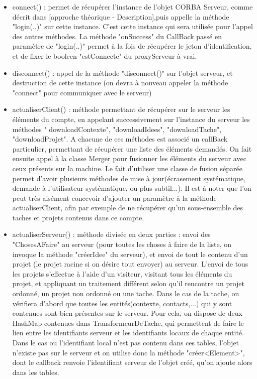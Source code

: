 \documentclass[a4paper, french, 11pt]{report}
\begin{document}
\begin{itemize}
\item connect() : permet de récupérer l'instance de l'objet CORBA Serveur, comme décrit dans [approche théorique - Description],puis appelle la méthode "login(..)" sur cette instance. C'est cette instance qui sera utilisée pour l'appel des autres méthodes. La méthode "onSuccess" du CallBack passé en paramètre de "login(..)" permet à la fois de récupérer le jeton d'identification, et de fixer le booleen "estConnecte" du proxyServeur à vrai.

\item disconnect() : appel de la méthode "disconnect()" sur l'objet serveur, et destruction de cette instance (on devra à nouveau appeler la méthode "connect" pour communiquer avec le serveur)

\item actualiserClient()  : méthode permettant de récupérer sur le serveur les éléments du compte, en appelant successivement sur l'instance du serveur les méthodes " downloadContexte", "downloadIdees", "downloadTache", "downloadProjet". A chacune de ces méthodes est associé un callBack particulier, permettant de récupérer une liste des éléments demandés. On fait ensuite appel à la classe Merger pour fusionner les éléments du serveur avec ceux présents sur la machine. Le fait d'utiliser une classe de fusion séparée permet d'avoir plusieurs méthodes de mise à jour(écrasement systématique, demande à l'utilisateur systématique, ou plus subtil...).
Il est à noter que l'on peut très aisément concevoir d'ajouter un paramètre à la méthode actualiserClient, afin par exemple de ne récupérer qu'un sous-ensemble des taches et projets contenus dans ce compte.

\item actualiserServeur() :  méthode divisée en deux parties : envoi des "ChosesAFaire" au serveur (pour toutes les choses à faire de la liste, on invoque la méthode "créerIdee" du serveur), et envoi de tout le contenu d'un projet (le projet racine si on désire tout envoyer) au serveur. L'envoi de tous les projets s'effectue à l'aide d'un visiteur, visitant tous les éléments du projet, et appliquant un traitement différent selon qu'il rencontre un projet ordonné, un projet non ordonné ou une tache. Dans le cas de la tache, on vérifiera d'abord que toutes les entités(contexte, contacts,...) qui y sont contenues sont bien présentes sur le serveur. Pour cela, on dispose de deux HashMap contenues dans TransformeurDeTache, qui permettent de faire le lien entre les identifiants serveur et les identifiants locaux de chaque entité. Dans le cas ou l'identifiant local n'est pas contenu dans ces tables, l'objet n'existe pas sur le serveur et on utilise donc la méthode "créer<Element>", dont le callback renvoie l'identifiant serveur de l'objet créé, qu'on ajoute alors dans les tables.

\end{itemize}
\end{document}
